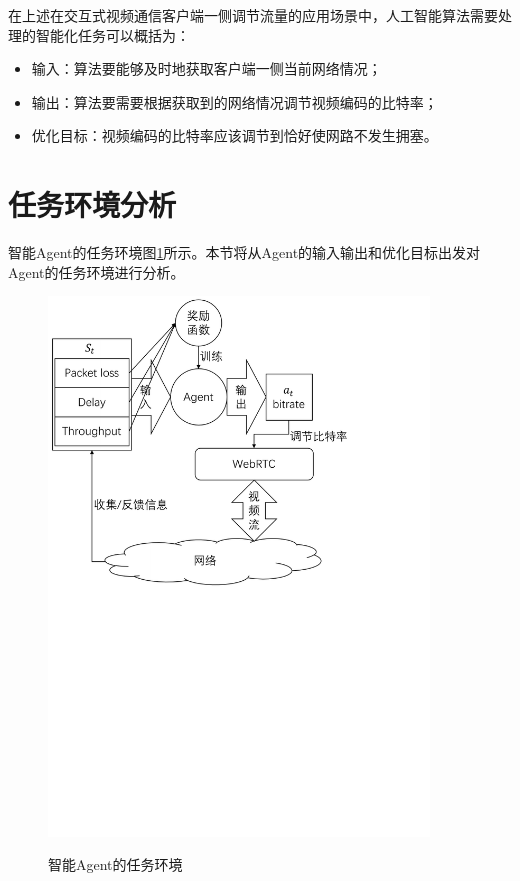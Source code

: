 \documentclass[a4paper]{ctexart}
\begin{document}
在上述在交互式视频通信客户端一侧调节流量的应用场景中，人工智能算法需要处理的智能化任务可以概括为：

\begin{itemize}
	\item 输入：算法要能够及时地获取客户端一侧当前网络情况；
	\item 输出：算法要需要根据获取到的网络情况调节视频编码的比特率；
	\item 优化目标：视频编码的比特率应该调节到恰好使网路不发生拥塞。
\end{itemize}

\section{任务环境分析}\label{sec:任务环境分析}

智能Agent的任务环境图\ref{figure:env}所示。本节将从Agent的输入输出和优化目标出发对Agent的任务环境进行分析。

\begin{figure}[htbp]
	\centering
	\includegraphics[width=0.9\textwidth, keepaspectratio]{figure/env.pdf}\\
	\caption{智能Agent的任务环境}\label{figure:env}
\end{figure}
\end{document}
